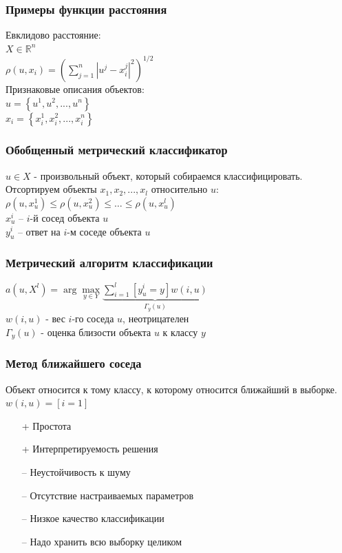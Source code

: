 \documentclass[12pt]{beamer}
\begin{document}
\begin{frame}\frametitle{Примеры функции расстояния}
Евклидово расстояние:\\
${X \in \mathbb{R}^{n}}$\\
\vspace{5mm}
${\rho (u, x_i) = (\sum\limits_{j=1}^n |u^j - x_i^j|^2)^{1/2}}$\\
\vspace{10mm}
Признаковые описания объектов:\\
${u = \left\{ u^1, u^2, ..., u^n \right\}}$ \\
${x_i = \left\{x_i^1, x_i^2, ..., x_i^n \right\} }$ 
\end{frame}

\begin{frame}\frametitle{Обобщенный метрический классификатор}
$u \in X$ - произвольный объект, который собираемся классифицировать.\\
\vspace{5mm}
Отсортируем объекты $x_1, x_2, ..., x_l$ относительно $u$:
${\rho(u, x_u^1) \leq \rho(u, x_u^2) \leq \dots \leq \rho(u, x_u^l)}$\\
\vspace{5mm}
${x_u^i}$ -- $i$-й сосед объекта $u$\\
${y_u^i}$ -- ответ на $i$-м соседе объекта $u$
 
\end{frame}

\begin{frame}\frametitle{Метрический алгоритм классификации}
${a(u, X^l) = \arg\max\limits_{y \in Y} \underbrace{\sum\limits_{i=1}^l [y_u^i = y]w(i, u)}_{\Gamma_y(u)} }$\\
\vspace{5mm}
$w(i, u)$ - вес $i$-го соседа $u$, неотрицателен\\
$\Gamma_y(u)$ - оценка близости объекта $u$ к классу ${y}$
\end{frame}

\begin{frame}\frametitle{Метод ближайшего соседа}
Объект относится к тому классу, к которому относится ближайший в выборке.\\
${w(i, u) = [i=1]}$\\
\vspace{5mm}
\begin{itemize}
	\item[+] Простота
	\item[+] Интерпретируемость решения
\end{itemize}
\vspace{5mm}
\begin{itemize}
	\item[--	] Неустойчивость к шуму
	\item[--	] Отсутствие настраиваемых параметров
	\item[--	] Низкое качество классификации
	\item[--	] Надо хранить всю выборку целиком		
\end{itemize}
\end{frame}
\end{document}
